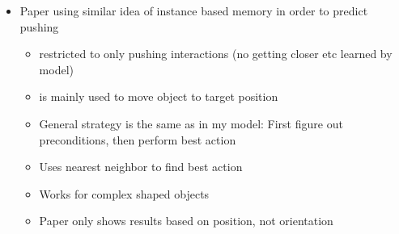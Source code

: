 \begin{itemize}
	\item \cite{pushing} Paper using similar idea of instance based memory in order to predict pushing
	\begin{itemize}
		\item restricted to only pushing interactions (no getting closer etc learned by model)
		\item is mainly used to move object to target position
		\item General strategy is the same as in my model: First figure out preconditions, then perform best action
		\item Uses nearest neighbor to find best action
		\item Works for complex shaped objects
		\item Paper only shows results based on position, not orientation
		

\end{itemize}
\end{itemize}
